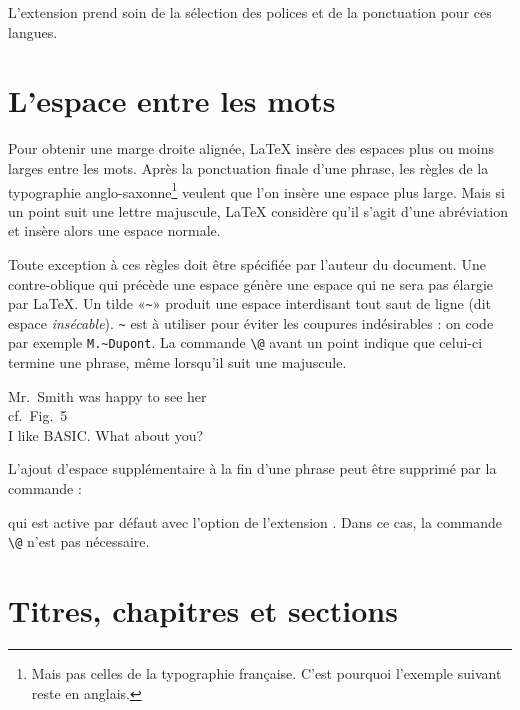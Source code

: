 L'extension \cite{xecjk} prend soin de la sélection des
polices et de la ponctuation pour ces langues.

\section{L'espace entre les mots}

Pour obtenir une marge droite alignée, \LaTeX{} insère des espaces
plus ou moins larges entre les mots. Après la ponctuation finale
d'une phrase, les règles de la typographie anglo-saxonne\footnote{Mais pas
  celles de la typographie française. C'est pourquoi l'exemple suivant reste
  en anglais. \NdT} veulent que
l'on insère une espace plus large.  Mais si un point suit une lettre
majuscule, \LaTeX{} considère qu'il s'agit d'une abréviation et insère
alors une espace normale.

Toute exception à ces règles doit être spécifiée par l'auteur du
document. Une contre-oblique qui précède une espace génère une espace qui ne
sera pas élargie par \LaTeX{}.  Un tilde «\verb|~|» produit
une espace interdisant tout saut de ligne (dit espace
\emph{insécable}).  \verb|~| est à utiliser pour éviter les coupures
indésirables : on code par exemple \verb|M.~Dupont|.  La
commande \verb|\@| avant un point indique que celui-ci termine une
phrase, même lorsqu'il suit une majuscule.
 

\begin{otherlanguage}{english}
\begin{example}
  Mr.~Smith was happy to see her\\
  cf.~Fig.~5\\
  I like BASIC\@. What about you?
\end{example}
\end{otherlanguage}

L'ajout d'espace supplémentaire à la fin d'une phrase peut être
supprimé par la commande :
\begin{lscommand}
\end{lscommand}
\noindent qui est active par défaut avec l'option  de
l'extension . Dans ce cas, la commande \verb|\@| n'est pas
nécessaire.



\section{Titres, chapitres et sections}


